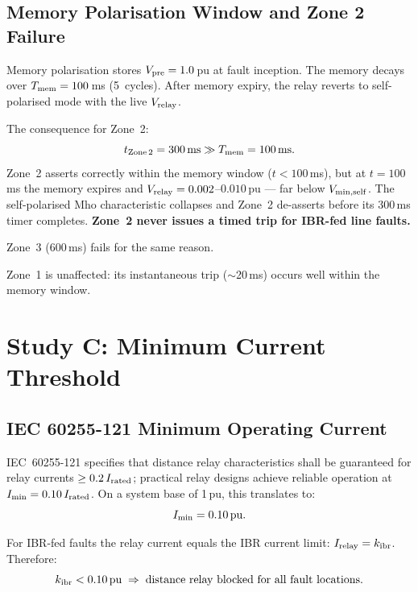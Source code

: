 \documentclass[11pt,a4paper]{article}
\begin{document}
\subsection{Memory Polarisation Window and Zone 2 Failure}

Memory polarisation stores $V_{\rm pre} = 1.0$\,pu at fault inception.
The memory decays over $T_{\rm mem} = 100$\,ms (5~cycles).  After memory
expiry, the relay reverts to self-polarised mode with the live
$V_{\rm relay}$.

The consequence for Zone~2:
\begin{equation}
  t_{\rm Zone\,2} = 300\,\text{ms} \gg T_{\rm mem} = 100\,\text{ms}.
\end{equation}
Zone~2 asserts correctly within the memory window ($t < 100$\,ms), but at
$t = 100$\,ms the memory expires and $V_{\rm relay} = 0.002$--$0.010$\,pu
— far below $V_{\rm min,self}$.  The self-polarised Mho characteristic
collapses and Zone~2 de-asserts before its 300\,ms timer completes.
\textbf{Zone~2 never issues a timed trip for IBR-fed line faults.}

Zone~3 (600\,ms) fails for the same reason.

Zone~1 is unaffected: its instantaneous trip ($\sim$20\,ms) occurs well
within the memory window.

\section{Study C: Minimum Current Threshold}

\subsection{IEC 60255-121 Minimum Operating Current}

IEC~60255-121 specifies that distance relay characteristics shall be
guaranteed for relay currents $\geq 0.2\,I_{\rm rated}$; practical relay
designs achieve reliable operation at $I_{\rm min} = 0.10\,I_{\rm rated}$.
On a system base of 1\,pu, this translates to:
\begin{equation}
  I_{\rm min} = 0.10\,\text{pu}.
\end{equation}

For IBR-fed faults the relay current equals the IBR current limit:
$I_{\rm relay} = k_{\rm ibr}$.  Therefore:
\begin{equation}
  k_{\rm ibr} < 0.10\,\text{pu} \;\Rightarrow\;
  \text{distance relay blocked for all fault locations.}
\end{equation}
\end{document}
